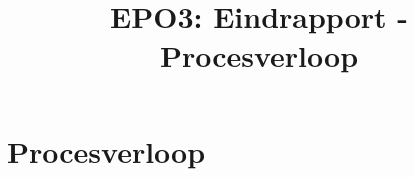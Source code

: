 \documentclass{scrartcl} %
\author{}
\title{EPO3: Eindrapport - Procesverloop}
\begin{document}
\chapter{Procesverloop}
\label{ch:procesverloop}
\end{document}
